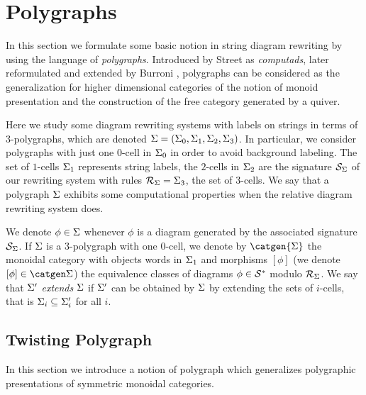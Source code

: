 \documentclass[a4paper]{article}
\begin{document}
\section{Polygraphs}

In this section we formulate some basic notion in string diagram rewriting by using the language of \emph{polygraphs}. 
Introduced by Street \cite{Street} as \emph{computads}, later reformulated and extended by Burroni \cite{Bur}, polygraphs can be considered as the generalization for higher dimensional categories of the notion of monoid presentation and the construction of the free category generated by a quiver.

Here we study some diagram rewriting systems with labels on strings in terms of $3$-polygraphs, which are denoted $\Sigma=(\Sigma_0,\Sigma_1,\Sigma_2,\Sigma_3)$.
In particular, we consider polygraphs with just one $0$-cell in $\Sigma_0$ in order to avoid background labeling. The set of $1$-cells $\Sigma_1$ represents string labels, the $2$-cells in $\Sigma_2$ are the  signature $\mathcal S_\Sigma$ of our rewriting system with rules $\mathcal R_\Sigma=\Sigma_3$, the set of $3$-cells. We say that a polygraph $\Sigma$ exhibits some computational properties when the relative diagram rewriting system does. 

\nota   We denote $\phi\in \Sigma$ whenever $\phi $ is a diagram generated by the associated signature $\mathcal S_\Sigma$. If $\Sigma$ is a $3$-polygraph with one $0$-cell, we denote by $\catgen{\s}$ the monoidal category with objects words in $\Sigma_1$ and morphisms $[\phi]$ (we denote $[\phi]\in\catgen \s$) the equivalence classes of diagrams $\phi\in\mathcal S^*$ modulo $\mathcal R_\Sigma$. We say that $\Sigma'$ \emph{extends} $\Sigma$ if $\Sigma'$ can be obtained by $\Sigma$ by extending the sets of $i$-cells, that is $\Sigma_i\subseteq \Sigma'_i$ for all $i$.







\subsection{Twisting Polygraph}
In this section we introduce a notion of polygraph which generalizes polygraphic presentations of symmetric monoidal categories.
\end{document}
